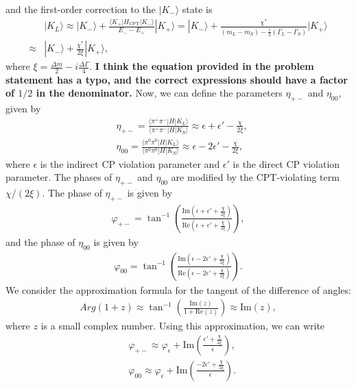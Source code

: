 and the first-order correction to the $|K_-\rangle$ state is
\begin{align}
    &|K_L\rangle \approx |K_-\rangle + \frac{\langle K_+|H_{\text{CPT}}|K_-\rangle}{E_- - E_+} |K_+\rangle = |K_-\rangle + \frac{\chi^*}{(m_L - m_S) - \frac{i}{2}(\Gamma_L - \Gamma_S)} |K_+\rangle\\
    \approx &|K_-\rangle + \frac{\chi^*}{2\xi} |K_+\rangle,
\end{align}
where $\xi = \frac{\Delta m}{2} - i\frac{\Delta \Gamma}{4}$. \textbf{I think the equation provided in the problem statement has a typo, and the correct expressions should have a factor of $1/2$ in the denominator.} Now, we can define the parameters $\eta_{+-}$ and $\eta_{00}$, given by
\begin{align}
    &\eta_{+-} = \frac{\langle \pi^+ \pi^-|H|K_L\rangle}{\langle \pi^+ \pi^-|H|K_S\rangle} \approx \epsilon + \epsilon'- \frac{\chi}{2\xi}, \\
    &\eta_{00} = \frac{\langle \pi^0 \pi^0|H|K_L\rangle}{\langle \pi^0 \pi^0|H|K_S\rangle} \approx \epsilon - 2\epsilon' - \frac{\chi}{2\xi},
\end{align}
where $\epsilon$ is the indirect CP violation parameter and $\epsilon'$ is the direct CP violation parameter. The phases of $\eta_{+-}$ and $\eta_{00}$ are modified by the CPT-violating term $\chi/(2\xi)$. The phase of $\eta_{+-}$ is given by
\begin{align}
    \varphi_{+-} = \tan^{-1}\left(\frac{\text{Im}(\epsilon + \epsilon' + \frac{\chi}{2\xi})}{\text{Re}(\epsilon + \epsilon' + \frac{\chi}{2\xi})}\right),
\end{align}and the phase of $\eta_{00}$ is given by
\begin{align}
    \varphi_{00} = \tan^{-1}\left(\frac{\text{Im}(\epsilon - 2\epsilon' + \frac{\chi}{2\xi})}{\text{Re}(\epsilon - 2\epsilon' + \frac{\chi}{2\xi})}\right).
\end{align}
We consider the approximation formula for the tangent of the difference of angles:
\begin{align}
    Arg(1+z) \approx \tan^{-1}\left(\frac{\text{Im}(z)}{1 + \text{Re}(z)}\right) \approx \text{Im}(z),
\end{align}
where $z$ is a small complex number. Using this approximation, we can write
\begin{align}
    &\varphi_{+-} \approx \varphi_\epsilon + \text{Im}\left(\frac{\epsilon' + \frac{\chi}{2\xi}}{\epsilon}\right), \\
    &\varphi_{00} \approx \varphi_\epsilon + \text{Im}\left(\frac{-2\epsilon' + \frac{\chi}{2\xi}}{\epsilon}\right).
\end{align}
